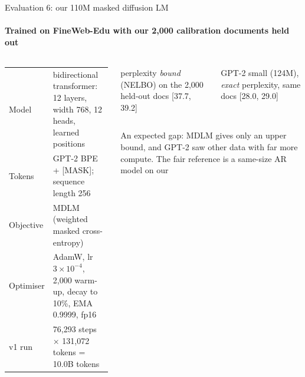 \documentclass[aspectratio=169,10pt,t]{beamer}
\newcommand{\ci}[1]{{\color{ink2}\scriptsize[#1]}}
\newcommand{\stat}[2]{%
  \begin{minipage}[t]{\linewidth}\raggedright
    {\fontsize{21}{23}\selectfont\firasemibold #1}\par\vspace{1.2mm}
    {\footnotesize\color{ink2}#2}
  \end{minipage}}
\begin{document}
\begin{frame}{Evaluation 6: our 110M masked diffusion LM}
  \framesubtitle{Trained on FineWeb-Edu with our 2,000 calibration documents held out}
  \vspace{1.5mm}
  \begin{columns}[T,onlytextwidth]
    \begin{column}{0.43\textwidth}
      \footnotesize
      \renewcommand{\arraystretch}{1.08}
      \begin{tabularx}{\linewidth}{@{}l L@{}}
        \toprule
        Model     & bidirectional transformer: 12 layers, width 768, 12 heads, learned positions \\
        Tokens    & GPT-2 BPE + [MASK]; sequence length 256 \\
        Objective & MDLM (weighted masked cross-entropy) \\
        Optimiser & AdamW, lr $3{\times}10^{-4}$, 2,000 warm-up, decay to 10\%, EMA 0.9999, fp16 \\
        v1 run    & 76,293 steps × 131,072 tokens = 10.0B tokens \\
        \bottomrule
      \end{tabularx}
    \end{column}
    \begin{column}{0.54\textwidth}
      \begin{columns}[T,onlytextwidth]
        \begin{column}{0.48\textwidth}
          \begin{panel}[colback=wash, colframe=wash, height=22mm]
            \stat{38.4}{perplexity \emph{bound} (NELBO) on the 2,000 held-out docs
              \ci{37.7, 39.2}}
          \end{panel}
        \end{column}
        \begin{column}{0.48\textwidth}
          \begin{panel}[height=22mm]
            \stat{28.5}{GPT-2 small (124M), \emph{exact} perplexity, same docs
              \ci{28.0, 29.0}}
          \end{panel}
        \end{column}
      \end{columns}
      \vspace{1.5mm}
      {\footnotesize\raggedright An expected gap: MDLM gives only an upper bound, and GPT-2
      saw other data with far more compute. The fair reference is a same-size AR model on our
}
\end{column}
\end{columns}
\end{frame}
\end{document}
